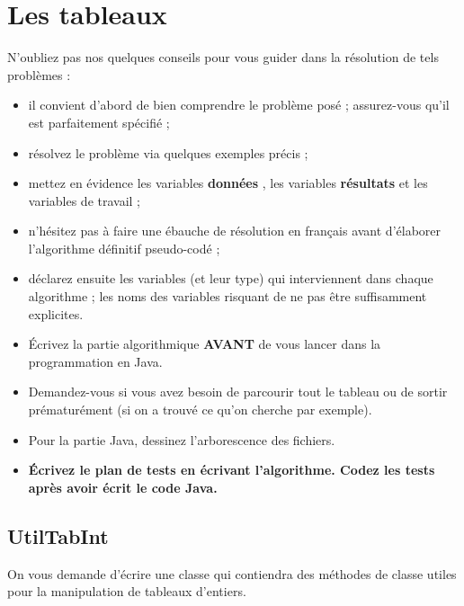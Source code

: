 \documentclass[11pt,a4paper]{article}
\begin{document}
            \section{Les tableaux}
      N'oubliez pas nos quelques conseils pour vous guider dans la r\'esolution de tels probl\`emes :
      
					\begin{itemize}
				
			\item il convient d'abord de bien comprendre le probl\`eme pos\'e ; assurez-vous qu'il est parfaitement sp\'ecifi\'e ;
			\item r\'esolvez le probl\`eme via quelques exemples pr\'ecis ;
			\item mettez en \'evidence les variables \textbf{\guillemotleft  donn\'ees \guillemotright }, les variables \textbf{\guillemotleft  r\'esultats \guillemotright } et les variables de travail ;
			\item n'h\'esitez pas \`a faire une \'ebauche de r\'esolution en fran\c cais avant d'\'elaborer l'algorithme d\'efinitif pseudo-cod\'e ;
			\item d\'eclarez ensuite les variables (et leur type) qui interviennent dans chaque algorithme ; les noms des variables risquant de ne pas \^etre suffisamment explicites.
			\item \'Ecrivez la partie algorithmique \textbf{AVANT} de vous lancer dans la programmation en Java.
			\item Demandez-vous si vous avez besoin de parcourir tout le tableau ou de sortir pr\'ematur\'ement (si on a trouv\'e ce qu'on cherche par exemple).
			\item Pour la partie Java, dessinez l'arborescence des fichiers. 
			\item \textbf{\'Ecrivez le plan de tests en \'ecrivant l'algorithme. Codez les tests apr\`es avoir \'ecrit le code Java.}
					\end{itemize}
				
            \par
        \subsection{UtilTabInt}
					On vous demande d'\'ecrire une classe
					\verb@UtilTabInt@
					qui contiendra des m\'ethodes de classe utiles 
					pour la manipulation de tableaux d'entiers.
				
            \par
        
\end{document}
